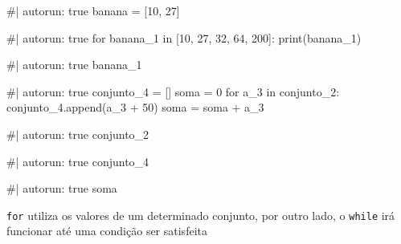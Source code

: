 \documentclass[
  letterpaper,
  DIV=11,
  numbers=noendperiod]{scrreprt}
\newenvironment{Shaded}{\begin{snugshade}}{\end{snugshade}}
\newcommand{\NormalTok}[1]{\textcolor[rgb]{0.00,0.23,0.31}{#1}}
\begin{document}
\begin{Shaded}
\begin{Highlighting}[]
\NormalTok{\#| autorun: true}
\NormalTok{banana = [10, 27]}
\end{Highlighting}
\end{Shaded}

\begin{Shaded}
\begin{Highlighting}[]
\NormalTok{\#| autorun: true}
\NormalTok{for banana\_1 in [10, 27, 32, 64, 200]:}
\NormalTok{    print(banana\_1)}
\end{Highlighting}
\end{Shaded}

\begin{Shaded}
\begin{Highlighting}[]
\NormalTok{\#| autorun: true}
\NormalTok{banana\_1}
\end{Highlighting}
\end{Shaded}

\begin{Shaded}
\begin{Highlighting}[]
\NormalTok{\#| autorun: true}
\NormalTok{conjunto\_4 = []}
\NormalTok{soma = 0}
\NormalTok{for a\_3 in conjunto\_2:}
\NormalTok{    conjunto\_4.append(a\_3 + 50)}
\NormalTok{    soma = soma + a\_3}
\end{Highlighting}
\end{Shaded}

\begin{Shaded}
\begin{Highlighting}[]
\NormalTok{\#| autorun: true}
\NormalTok{conjunto\_2}
\end{Highlighting}
\end{Shaded}

\begin{Shaded}
\begin{Highlighting}[]
\NormalTok{\#| autorun: true}
\NormalTok{conjunto\_4}
\end{Highlighting}
\end{Shaded}

\begin{Shaded}
\begin{Highlighting}[]
\NormalTok{\#| autorun: true}
\NormalTok{soma}
\end{Highlighting}
\end{Shaded}

\texttt{for} utiliza os valores de um determinado conjunto, por outro
lado, o \texttt{while} irá funcionar até uma condição ser satisfeita
\end{document}

